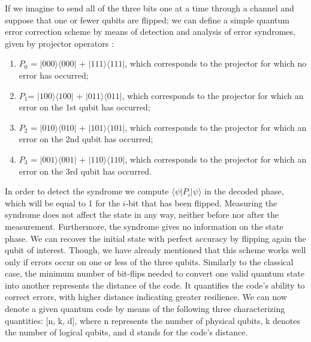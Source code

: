 \documentclass{Configuration_Files/PoliMi3i_thesis}
\begin{document}
If we imagine to send all of the three bits one at a time through a channel and suppose that one or fewer qubits are flipped; we can define a simple quantum error correction scheme by means of detection and analysis of error syndromes, given by projector operators \cite{Nie06}:

\begin{enumerate}
	\item  $P_0$ = $|000 \rangle \langle 000|$ + $|111 \rangle \langle 111|$, which corresponds to the projector for which no error has occurred;
	\item $P_1$= $|100 \rangle \langle 100|$ + $|011 \rangle \langle 011|$, which corresponds to the projector for which an error on the 1st qubit has occurred;
	\item $P_2$ = $|010 \rangle \langle 010|$ + $|101 \rangle \langle 101|$, which corresponds to the projector for which an error on the 2nd qubit has occurred;
	\item $P_3$ = $|001 \rangle \langle 001|$ + $|110 \rangle \langle 110|$, which corresponds to the projector for which an error on the 3rd qubit has occurred.
\end{enumerate}

In order to detect the syndrome we compute $\langle \psi| P_i | \psi \rangle $ in the decoded phase, which will be equal to 1 for the $i$-bit that has been flipped.
Measuring the syndrome does not affect the state in any way, neither before nor after the measurement. Furthermore, the syndrome gives no information on the state phase. We can recover the initial state with perfect accuracy by flipping again the qubit of interest. Though, we have already mentioned that this scheme works well only if errors occur on one or less of the three qubits.\newline
Similarly to the classical case, the minimum number of bit-flips needed to convert one valid quantum state into another represents the distance of the code. It quantifies the code's ability to correct errors, with higher distance indicating greater resilience.
We can now denote a given quantum code by means of the following three characterizing quantities: [n, k, d], where n represents the number of physical qubits, k denotes the number of logical qubits, and d stands for the code's distance. \newline
\end{document}
